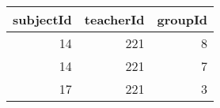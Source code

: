\begin{tabular}{rrr}
\toprule
subjectId & teacherId & groupId \\
\midrule
14 & 221 & 8 \\
14 & 221 & 7 \\
17 & 221 & 3 \\
\bottomrule
\end{tabular}
